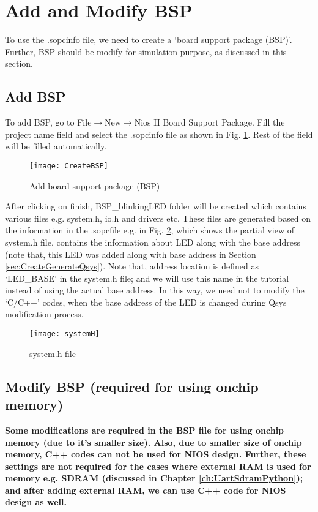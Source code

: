 \section{Add and Modify BSP}\label{sec:add_modify_bsp}
To use the .sopcinfo file, we need to create a `board support package (BSP)'. Further, BSP should be modify for simulation purpose, as discussed in this section.

\subsection{Add BSP}\label{sec:AddBSP}
To add BSP, go to File$\rightarrow$New$\rightarrow$Nios II Board Support Package. Fill the project name field and select the .sopcinfo file as shown in Fig. \ref{fig:CreateBSP}. Rest of the field will be filled automatically. 
\begin{figure}[!h]
	\centering
	\texttt{[image: CreateBSP]}
	\caption{Add board support package (BSP)}
	\label{fig:CreateBSP}
\end{figure}

After clicking on finish, BSP\_blinkingLED folder will be created which contains various files e.g. system.h, io.h and drivers etc. These files are generated based on the information in the .sopcfile e.g. in Fig. \ref{fig:systemH}, which shows the partial view of system.h file, contains the information about LED along with the base address (note that, this LED was added along with base address in Section \ref{sec:CreateGenerateQsys}).  Note that, address location is defined as `LED\_BASE' in the system.h file; and we will use this name in the tutorial instead of using the actual base address. In this way, we need not to modify the `C/C++' codes, when the base address of the LED is changed during Qsys modification process.  

\begin{figure}[!h]
	\centering
	\texttt{[image: systemH]}
	\caption{system.h file}
	\label{fig:systemH}
\end{figure}

\subsection{Modify BSP (required for using onchip memory)} \label{sec:ModifyBSP}
\textbf{Some modifications are required in the BSP file for using onchip memory (due to it's smaller size). Also, due to smaller size of onchip memory, C++ codes can not be used for NIOS design. Further, these settings are not required for the cases where external RAM is used for memory e.g. SDRAM (discussed in Chapter \ref{ch:UartSdramPython}); and after adding external RAM, we can use C++ code for NIOS design as well.} 

